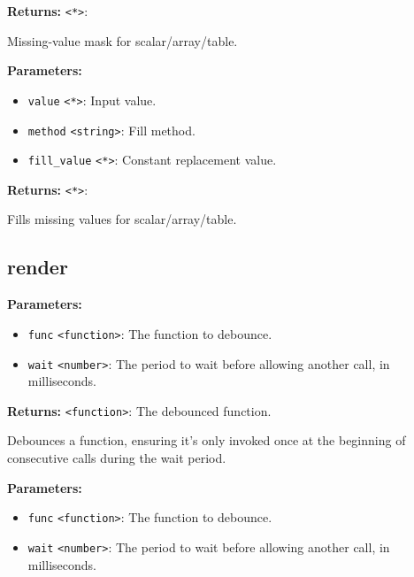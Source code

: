 \documentclass[12pt,a4paper]{article}
\begin{document}
\noindent \textbf{Returns:} \texttt{<*>}:

\noindent Missing-value mask for scalar/array/table.

\vspace{5mm}
\noindent {}


\noindent \textbf{Parameters:}
\begin{itemize}
  \item \texttt{value} \texttt{<*>}: Input value.
  \item \texttt{method} \texttt{<string>}: Fill method.
  \item \texttt{fill\_value} \texttt{<*>}: Constant replacement value.
\end{itemize}

\noindent \textbf{Returns:} \texttt{<*>}:

\noindent Fills missing values for scalar/array/table.


\subsection{render}
\vspace{5mm}
\noindent {}


\noindent \textbf{Parameters:}
\begin{itemize}
  \item \texttt{func} \texttt{<function>}: The function to debounce.
  \item \texttt{wait} \texttt{<number>}: The period to wait before allowing another call, in milliseconds.
\end{itemize}

\noindent \textbf{Returns:} \texttt{<function>}: The debounced function.

\noindent Debounces a function, ensuring it's only invoked once at the beginning of consecutive calls during the wait period.

\vspace{5mm}
\noindent {}


\noindent \textbf{Parameters:}
\begin{itemize}
  \item \texttt{func} \texttt{<function>}: The function to debounce.
  \item \texttt{wait} \texttt{<number>}: The period to wait before allowing another call, in milliseconds.
\end{itemize}
\end{document}
